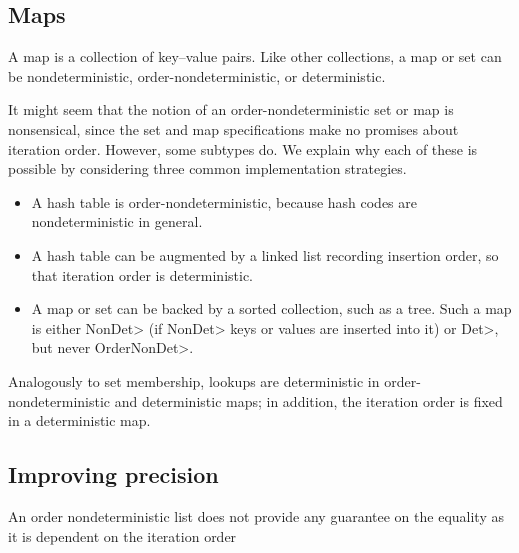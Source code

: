 \subsection{Maps}\label{maps}
A map is a collection of key--value pairs.
Like other collections, a map or set can be nondeterministic,
order-nondeterministic, or deterministic.

It might seem that the notion of an order-nondeterministic set or map is
nonsensical, since the set and map specifications make no promises about
iteration order.  However, some subtypes do.
We explain why each of these is possible by considering three common
implementation strategies.

\begin{itemize}
\item
A hash table is order-nondeterministic, because hash codes are
nondeterministic in general.
\item
A hash table can be augmented by a linked list recording insertion order,
so that iteration order is deterministic.
\item
A map or set can be backed by a sorted collection, such as a tree.  Such a map is
either \<NonDet> (if \<NonDet> keys or values are inserted into it) or
\<Det>, but never \<OrderNonDet>.
\end{itemize}

Analogously to set membership, lookups are deterministic in
order-nondeterministic and deterministic maps; in addition, the iteration
order is fixed in a deterministic map.


\subsection{Improving precision}\label{precision}

An order nondeterministic list does not provide any guarantee on the
equality as it is dependent on the iteration order

